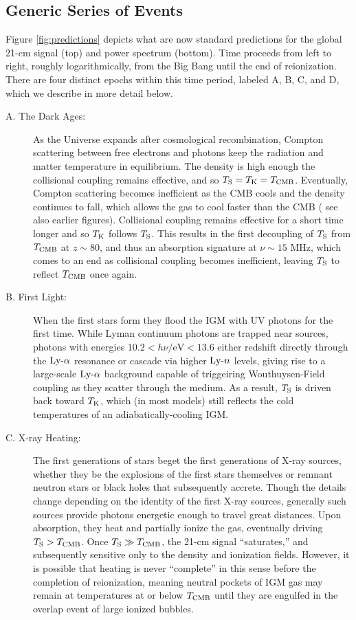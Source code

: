 \subsection{Generic Series of Events}
Figure \ref{fig:predictions} depicts what are now standard predictions for the global 21-cm signal (top) and power spectrum (bottom). Time proceeds from left to right, roughly logarithmically, from the Big Bang until the end of reionization. There are four distinct epochs within this time period, labeled A, B, C, and D, which we describe in more detail below.
\begin{description}
	\item[A. The Dark Ages:] As the Universe expands after cosmological recombination, Compton scattering between free electrons and photons keep the radiation and matter temperature in equilibrium. The density is high enough the collisional coupling remains effective, and so $T_{\text{S}} = T_{\text{K}} = T_{\text{CMB}}$. Eventually, Compton scattering becomes inefficient as the CMB cools and the density continues to fall, which allows the gas to cool faster than the CMB ({\color{red} see also earlier figures}). Collisional coupling remains effective for a short time longer and so $T_{\text{K}}$ follows $T_{\text{S}}$. This results in the first decoupling of $T_{\text{S}}$ from $T_{\text{CMB}}$ at $z \sim 80$, and thus an absorption signature at $\nu \sim 15$ MHz, which comes to an end as collisional coupling becomes inefficient, leaving $T_{\text{S}}$ to reflect $T_{\text{CMB}}$ once again.
	\item[B. First Light:] When the first stars form they flood the IGM with UV photons for the first time. While Lyman continuum photons are trapped near sources, photons with energies $10.2 < h\nu / \mathrm{eV} < 13.6$ either redshift directly through the $\text{Ly-}\alpha$ resonance or cascade via higher $\text{Ly-}n$ levels, giving rise to a large-scale $\text{Ly-}\alpha$ background capable of triggeiring Wouthuysen-Field coupling as they scatter through the medium. As a result, $T_{\text{S}}$ is driven back toward $T_{\text{K}}$, which (in most models) still reflects the cold temperatures of an adiabatically-cooling IGM.
	\item[C. X-ray Heating:] The first generations of stars beget the first generations of X-ray sources, whether they be the explosions of the first stars themselves or remnant neutron stars or black holes that subsequently accrete. Though the details change depending on the identity of the first X-ray sources, generally such sources provide photons energetic enough to travel great distances. Upon absorption, they heat and partially ionize the gas, eventually driving $T_{\text{S}} > T_{\text{CMB}}$. Once $T_{\text{S}} \gg T_{\text{CMB}}$, the 21-cm signal ``saturates,'' and subsequently sensitive only to the density and ionization fields. However, it is possible that heating is never ``complete'' in this sense before the completion of reionization, meaning neutral pockets of IGM gas may remain at temperatures at or below $T_{\text{CMB}}$ until they are engulfed in the overlap event of large ionized bubbles.

\end{description}
